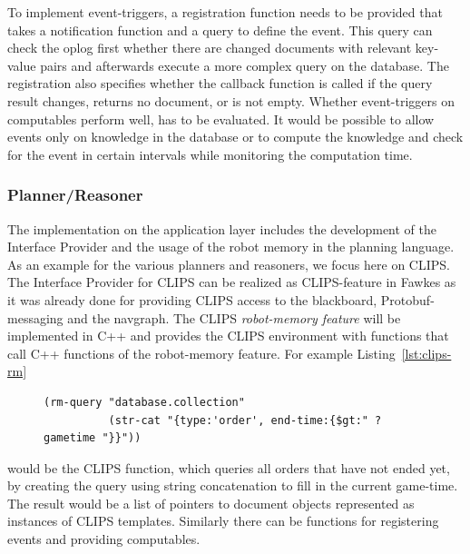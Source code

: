 \documentclass[a4paper,11pt]{article}
\newcommand{\reflst}[1]{Listing~\ref{#1}}
\begin{document}
To implement event-triggers, a registration function needs to be
provided that takes a notification function and a query to define the
event. This query can check the oplog first whether there are changed
documents with relevant key-value pairs and afterwards execute a more
complex query on the database. The registration also specifies whether
the callback function is called if the query result changes, returns
no document, or is not empty. Whether event-triggers on computables
perform well, has to be evaluated. It would be possible to allow
events only on knowledge in the database or to compute the knowledge
and check for the event in certain intervals while monitoring the
computation time.


\subsubsection{Planner/Reasoner}
\label{sec:impl-planner}
The implementation on the application layer includes the development
of the Interface Provider and the usage of the robot memory in the
planning language. As an example for the various planners and
reasoners, we focus here on CLIPS. The Interface Provider for CLIPS
can be realized as CLIPS-feature in Fawkes as it was already done for
providing CLIPS access to the blackboard, Protobuf-messaging and the
navgraph. The CLIPS \emph{robot-memory feature} will be implemented in C++
and provides the CLIPS environment with functions that call C++
functions of the robot-memory feature. For example \reflst{lst:clips-rm}
\begin{figure}
  \begin{lstlisting}[showlines,style=ReallySmallCLIPS, caption={CLIPS function to execute a query},
  label=lst:clips-rm,
  emph={skill, args, state, target, res},
  emphstyle=\bfseries\color{green!80!black},
  emph={[2]\?skill, \$\?args, wait-for-lock, \?target, use,
  WAIT-FOR-LOCK, SKILL-EXECUTION, running},
  emphstyle={[2]\bfseries\color{blue!80!black}},
  morekeywords={retract, assert, modify, skill-call, skill-to-execute,
    wait-for-lock}]
(rm-query "database.collection"
          (str-cat "{type:'order', end-time:{$gt:" ?gametime "}}"))
\end{lstlisting} %
\end{figure}
would be the CLIPS function, which queries all orders that have not
ended yet, by creating the query using string concatenation to fill in
the current game-time. The result would be a list of pointers to document
objects represented as instances of CLIPS templates. Similarly there
can be functions for registering events and providing computables.
\end{document}
